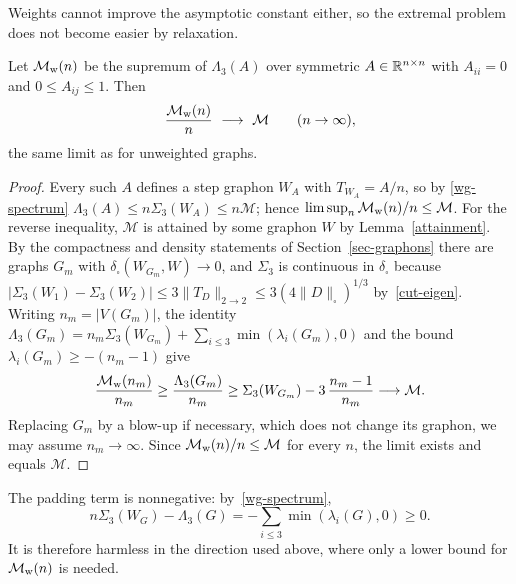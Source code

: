 Weights cannot improve the asymptotic constant either, so the extremal
problem does not become easier by relaxation.
\begin{proposition}\label{no-gain}
Let $\mathcal M_{\rm w}(n)$ be the supremum of $\Lambda_3(A)$ over symmetric
$A\in\mathbb R^{n\times n}$ with $A_{ii}=0$ and $0\le A_{ij}\le1$. Then
\[
 \frac{\mathcal M_{\rm w}(n)}n\ \longrightarrow\ \mathcal M
 \qquad(n\to\infty),
\]
the same limit as for unweighted graphs.
\end{proposition}
\begin{proof}
Every such $A$ defines a step graphon $W_A$ with $T_{W_A}=A/n$, so by
\eqref{wg-spectrum} $\Lambda_3(A)\le n\Sigma_3(W_A)\le n\mathcal M$; hence
$\limsup_n\mathcal M_{\rm w}(n)/n\le\mathcal M$. For the reverse inequality,
$\mathcal M$ is attained by some graphon $W$ by Lemma~\ref{attainment}. By the
compactness and density statements of Section~\ref{sec-graphons} there are
graphs $G_m$ with $\delta_\square(W_{G_m},W)\to0$, and $\Sigma_3$ is
continuous in $\delta_\square$ because
$|\Sigma_3(W_1)-\Sigma_3(W_2)|\le3\|T_D\|_{2\to2}\le3(4\|D\|_\square)^{1/3}$
by~\eqref{cut-eigen}. Writing $n_m=|V(G_m)|$, the identity
$\Lambda_3(G_m)=n_m\Sigma_3(W_{G_m})+\sum_{i\le3}\min(\lambda_i(G_m),0)$
and the bound $\lambda_i(G_m)\ge-(n_m-1)$ give
\[
 \frac{\mathcal M_{\rm w}(n_m)}{n_m}
   \ge\frac{\Lambda_3(G_m)}{n_m}
   \ge\Sigma_3(W_{G_m})-3\,\frac{n_m-1}{n_m}
   \longrightarrow\mathcal M .
\]
Replacing $G_m$ by a blow-up if necessary, which does not change its graphon,
we may assume $n_m\to\infty$. Since $\mathcal M_{\rm w}(n)/n\le\mathcal M$
for every $n$, the limit exists and equals $\mathcal M$.
\end{proof}
\begin{remark}\label{padding-note}
The padding term is nonnegative: by~\eqref{wg-spectrum},
\[
 n\Sigma_3(W_G)-\Lambda_3(G)=-\sum_{i\le3}\min(\lambda_i(G),0)\ge0 .
\]
It is therefore harmless in the direction used above, where only a lower bound
for $\mathcal M_{\rm w}(n)$ is needed.
\end{remark}

